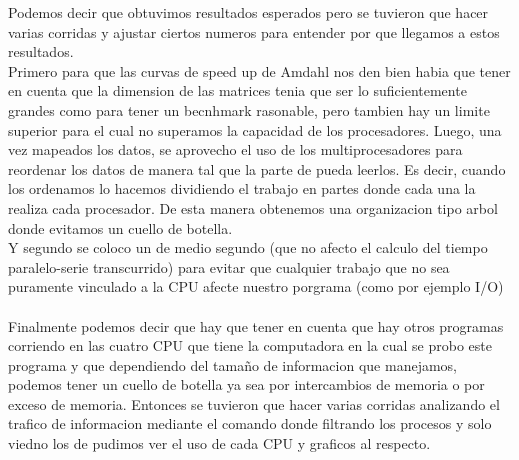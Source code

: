 Podemos decir que obtuvimos resultados esperados pero se tuvieron que hacer
varias corridas y ajustar ciertos numeros para entender por que llegamos a estos
resultados. \\
Primero para que las curvas de speed up de Amdahl nos den bien habia
que tener en cuenta que la dimension de las matrices tenia que ser lo
suficientemente grandes como para tener un becnhmark rasonable, pero tambien hay
un limite superior para el cual no superamos la capacidad de los procesadores.
Luego, una vez mapeados los datos, se aprovecho el uso de los multiprocesadores
para reordenar los datos de manera tal que la parte de  pueda leerlos.
Es decir, cuando los ordenamos lo hacemos dividiendo el trabajo en partes donde
cada una la realiza cada procesador. De esta manera obtenemos una organizacion
tipo arbol donde evitamos un cuello de botella.\\
Y segundo se coloco un  de medio segundo (que no afecto el calculo
del tiempo paralelo-serie transcurrido) para evitar que cualquier trabajo que no
sea puramente vinculado a la CPU afecte nuestro porgrama (como por ejemplo I/O) \\\\
Finalmente podemos decir que hay que tener en cuenta que hay otros programas
corriendo en las cuatro CPU que tiene la computadora en la cual se probo este
programa y que dependiendo del tamaño de informacion que manejamos, podemos tener
un cuello de botella ya sea por intercambios de memoria o por exceso de memoria.
Entonces se tuvieron que hacer varias corridas analizando el trafico de
informacion mediante el comando  donde filtrando
los procesos y solo viedno los de  pudimos ver el uso de cada CPU
y graficos al respecto.
